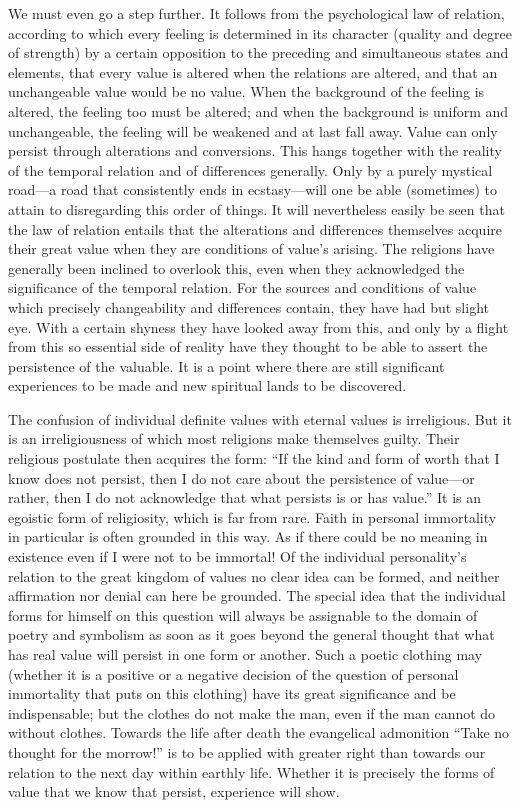 \documentclass[12pt,a4paper]{book}
\newcommand{\opage}[1]{\marginnote{\footnotesize\textit{[#1]}}}
\begin{document}
We must even go a step further. It follows from the psychological law of relation, according to which
every feeling is determined in its character (quality and degree of strength) by a certain opposition
to the preceding and simultaneous states and elements, that every value is altered when the relations
are altered, and that an unchangeable value would be no value. When the background of the feeling is
altered, the feeling too must be altered; and when the background is uniform and unchangeable, the
feeling will be weakened and at last fall away. Value can only persist through alterations and
conversions. This hangs together with the reality of the temporal relation and of differences
generally. Only by a purely mystical road---a road that consistently ends in ecstasy---will one be able
(sometimes) to attain to disregarding this order of things. It will nevertheless easily be seen that
the law of relation entails that the alterations and differences themselves acquire their great value
when they are conditions of value's arising. The religions have generally been inclined to overlook
this, even when they acknowledged the significance of the temporal relation. For the sources and
conditions of value which precisely changeability and differences contain, they have had 
\opage{176}but slight
eye. With a certain shyness they have looked away from this, and only by a flight from this so
essential side of reality have they thought to be able to assert the persistence of the valuable. It is
a point where there are still significant experiences to be made and new spiritual lands to be
discovered.

The confusion of individual definite values with eternal values is irreligious. But it is an
irreligiousness of which most religions make themselves guilty. Their religious postulate then acquires
the form: ``If the kind and form of worth that I know does not persist, then I do not care about the
persistence of value---or rather, then I do not acknowledge that what persists is or has value.'' It is
an egoistic form of religiosity, which is far from rare. Faith in personal immortality in particular is
often grounded in this way. As if there could be no meaning in existence even if I were not to be
immortal! Of the individual personality's relation to the great kingdom of values no clear idea can be
formed, and neither affirmation nor denial can here be grounded. The special idea that the individual
forms for himself on this question will always be assignable to the domain of poetry and symbolism as
soon as it goes beyond the general thought that what has real value will persist in one form or another.
Such a poetic clothing may (whether it is a positive or a negative decision of the question of personal
immortality that puts on this clothing) have its great significance and be indispensable; but the
clothes do not make the man, even if the man cannot do without clothes. Towards the life after death the
evangelical admonition ``Take no thought for the morrow!'' is to be applied with greater right than
towards our relation to the next day within earthly life. Whether it is precisely the forms of value
that we know that persist, experience will show.
\end{document}
